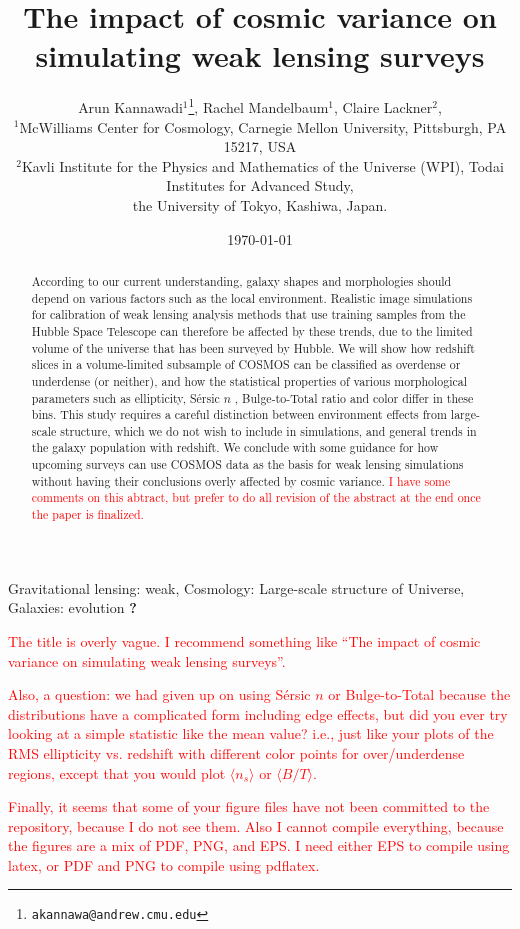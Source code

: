 \documentclass[twocolumn,useAMS,usenatbib]{mn2e}
\title[WL simulation]{The impact of cosmic variance on simulating weak lensing surveys}
\author[Kannawadi et al.]
{Arun Kannawadi$^1$\thanks{\tt akannawa@andrew.cmu.edu}, 
Rachel Mandelbaum$^1$,
Claire Lackner$^2$, 
\\$^1$McWilliams Center for Cosmology, Carnegie Mellon University, Pittsburgh, PA 15217, USA
\\$^2$Kavli Institute for the Physics and Mathematics of the Universe (WPI), Todai Institutes for Advanced Study,\\ the University of Tokyo, Kashiwa, Japan.
}
\date{\today}
\newcommand{\rachel}[1]{{\textcolor{red}{#1}}}
\newcommand{\sersicn}{S\'{e}rsic $n$ }
\newcommand{\btt}{Bulge-to-Total }
\begin{document}

\maketitle

\begin{abstract}
According to our current understanding, galaxy shapes and morphologies should depend on various factors such as the local environment. Realistic image simulations for calibration of weak lensing analysis methods that use training samples from the Hubble Space Telescope can therefore be affected by these trends, due to the limited volume of the universe that has been surveyed by Hubble. We will show how redshift slices in a volume-limited subsample of COSMOS can be classified as overdense or underdense (or neither), and how the statistical properties of various morphological parameters such as ellipticity, \sersicn, \btt ratio and color differ in these bins. This study requires a careful distinction between environment effects from large-scale structure, which we do not wish to include in simulations, and general trends in the galaxy population with redshift. We conclude with some guidance for how upcoming surveys can use COSMOS data as the basis for weak lensing simulations without having their conclusions overly affected by cosmic variance.  
\rachel{I have some comments on this abtract, but prefer to do all
  revision of the abstract at the end once the paper is finalized.}
\end{abstract}

\begin{keywords}
 Gravitational lensing: weak, Cosmology: Large-scale structure of Universe, Galaxies: evolution {\bf ?}
\end{keywords}

\rachel{The title is overly vague.  I recommend something like ``The
  impact of cosmic variance on simulating weak lensing surveys''.}

\rachel{Also, a question: we had given up on using \sersicn{} or \btt{}
  because the distributions have a complicated form including edge
  effects, but did you ever try looking at a simple statistic like the
  mean value?  i.e., just like your plots of the RMS ellipticity
  vs. redshift with different color points for over/underdense
  regions, except that you would plot $\langle n_s \rangle$ or
  $\langle B/T\rangle$.}

\rachel{Finally, it seems that some of your figure files have not been
  committed to the repository, because I do not see them.  Also I
  cannot compile everything, because the figures are a mix of PDF, PNG, and EPS.
I need either EPS to compile using latex, or PDF and PNG to compile
using pdflatex.}
\end{document}
